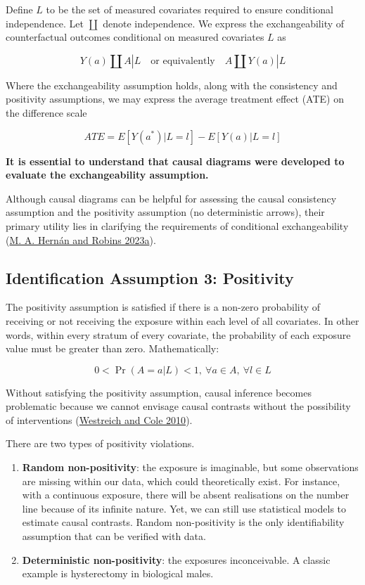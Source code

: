 \documentclass[
  singlecolumn]{report}
\begin{document}
Define \(L\) to be the set of measured covariates required to ensure
conditional independence. Let \(\coprod\) denote independence. We
express the exchangeability of counterfactual outcomes conditional on
measured covariates \(L\) as

\[
Y(a) \coprod  A|L \quad \text{or equivalently} \quad A \coprod  Y(a)|L
\]

Where the exchangeability assumption holds, along with the consistency
and positivity assumptions, we may express the average treatment effect
(ATE) on the difference scale

\[
ATE = E[Y(a^*)|L = l] - E[Y(a)|L = l]
\]

\textbf{It is essential to understand that causal diagrams were
developed to evaluate the exchangeability assumption.}

Although causal diagrams can be helpful for assessing the causal
consistency assumption and the positivity assumption (no deterministic
arrows), their primary utility lies in clarifying the requirements of
conditional exchangeability (\protect\hyperlink{ref-hernuxe1n2023a}{M.
A. Hernán and Robins 2023a}).

\hypertarget{identification-assumption-3-positivity}{%
\subsection{Identification Assumption 3:
Positivity}\label{identification-assumption-3-positivity}}

The positivity assumption is satisfied if there is a non-zero
probability of receiving or not receiving the exposure within each level
of all covariates. In other words, within every stratum of every
covariate, the probability of each exposure value must be greater than
zero. Mathematically:

\[
0 < \Pr(A=a|L)<1, ~ \forall a \in A, ~ \forall l \in L
\]

Without satisfying the positivity assumption, causal inference becomes
problematic because we cannot envisage causal contrasts without the
possibility of interventions
(\protect\hyperlink{ref-westreich2010}{Westreich and Cole 2010}).

There are two types of positivity violations.

\begin{enumerate}
\def\labelenumi{\arabic{enumi}.}
\item
  \textbf{Random non-positivity}: the exposure is imaginable, but some
  observations are missing within our data, which could theoretically
  exist. For instance, with a continuous exposure, there will be absent
  realisations on the number line because of its infinite nature. Yet,
  we can still use statistical models to estimate causal contrasts.
  Random non-positivity is the only identifiability assumption that can
  be verified with data.
\item
  \textbf{Deterministic non-positivity}: the exposures inconceivable. A
  classic example is hysterectomy in biological males.
\end{enumerate}
\end{document}
